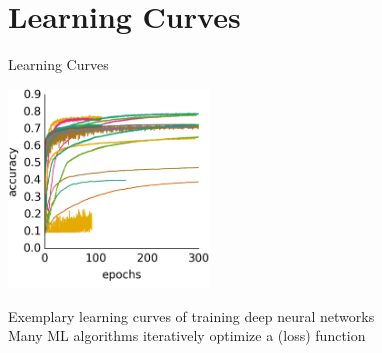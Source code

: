 \section{Learning Curves}
\begin{frame}{Learning Curves}

\centering
\includegraphics[width=0.4\textwidth]{images/learningcurve/learning_curves.png}

Exemplary learning curves of training deep neural networks\\
Many ML algorithms iteratively optimize a (loss) function

\end{frame}

